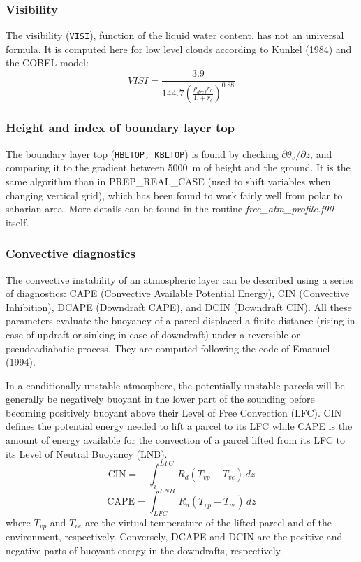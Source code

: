 \subsubsection{Visibility}
The visibility ({\tt VISI}), function of the liquid water content, has not an universal formula.
It is computed here for low level clouds according to Kunkel (1984)
and the COBEL model:
\begin{equation}
VISI=\frac{3.9}{144.7(\frac{\rho_{dref}r_c}{1.+r_c})^{0.88}}
\end{equation}

\subsubsection{Height and index of boundary layer top}
The boundary layer top  ({\tt HBLTOP, KBLTOP}) is found by checking 
$\partial\theta_v/\partial z$, and comparing it to the gradient
between 5000~m of
height and the ground. It is the same algorithm than in PREP\_REAL\_CASE (used
to shift variables when changing vertical grid), which has been found to work 
fairly well from polar to saharian area. More details can be found in the 
routine {\it free\_atm\_profile.f90} itself.

\subsubsection{Convective diagnostics}
The convective instability of an atmospheric layer can be described using a series of diagnostics: CAPE (Convective Available Potential Energy), CIN (Convective Inhibition), DCAPE (Downdraft CAPE), and DCIN (Downdraft CIN). All these parameters evaluate the buoyancy of a parcel displaced a finite distance (rising in case of updraft or sinking in case of downdraft) under a reversible or pseudoadiabatic process. They are computed following the code of Emanuel (1994).

In a conditionally unstable atmosphere, the potentially unstable parcels will be generally be negatively buoyant in the lower part of the sounding before becoming positively buoyant above their Level of Free Convection (LFC). CIN defines the potential energy needed to lift a parcel to its LFC while CAPE is the amount of energy available for the convection of a parcel lifted from its LFC to its Level of Neutral Buoyancy (LNB). 
\begin{equation}
\mbox{CIN}= - \, \int_{i}^{LFC} \, R_d ( T_{vp} - T_{ve}) \, dz
\end{equation}
\begin{equation}
\mbox{CAPE}=\int_{LFC}^{LNB} \, R_d ( T_{vp} - T_{ve}) \, dz
\end{equation}
where $T_{vp}$ and $T_{ve}$ are the virtual temperature of the lifted parcel and of the environment, respectively. Conversely, DCAPE and DCIN are the positive and negative parts of buoyant energy in the downdrafts, respectively.
%
